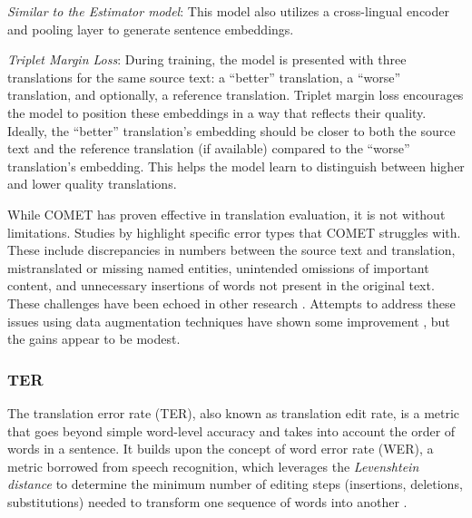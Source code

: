 {{\begin{description}
    \begin{description}
        \item\emph{Similar to the Estimator model}: This model also utilizes a cross-lingual encoder and pooling layer to generate sentence embeddings.
        \item\emph{Triplet Margin Loss}: During training, the model is presented with three translations for the same source text: a ``better'' translation, a ``worse'' translation, and optionally, a reference translation. Triplet margin loss encourages the model to position these embeddings in a way that reflects their quality. Ideally, the ``better'' translation's embedding should be closer to both the source text and the reference translation (if available) compared to the ``worse'' translation's embedding. This helps the model learn to distinguish between higher and lower quality translations.
    \end{description}
\end{description}

While COMET has proven effective in translation evaluation, it is not without limitations. Studies by \textcite{glushkova2023bleu} highlight specific error types that COMET struggles with. These include discrepancies in numbers between the source text and translation, mistranslated or missing named entities, unintended omissions of important content, and unnecessary insertions of words not present in the original text. These challenges have been echoed in other research \parencite{amrhein-sennrich-2022-identifying, alves-etal-2022-robust}. Attempts to address these issues using data augmentation techniques have shown some improvement \parencite{alves-etal-2022-robust}, but the gains appear to be modest.


\subsubsection{TER}

The translation error rate (TER), also known as translation edit rate, is a metric that goes beyond simple word-level accuracy and takes into account the order of words in a sentence. It builds upon the concept of word error rate (WER), a metric borrowed from speech recognition, which leverages the \emph{Levenshtein distance} to determine the minimum number of editing steps (insertions, deletions, substitutions) needed to transform one sequence of words into another \parencite{snover-etal-2006-study, koehn2012statistical}.

}}
